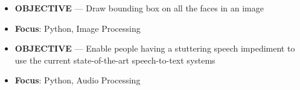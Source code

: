 \documentclass[10pt,a4paper]{altacv}
\begin{document}

%


\begin{itemize}
	\item \textbf{OBJECTIVE} --- Draw bounding box on all the faces in an image
	\item \textbf{Focus}: Python, Image Processing
\end{itemize}


\begin{itemize}
	\item \textbf{OBJECTIVE} --- Enable people having a stuttering speech impediment to use the current state-of-the-art speech-to-text systems
	\item \textbf{Focus}: Python, Audio Processing
\end{itemize}
\end{document}
